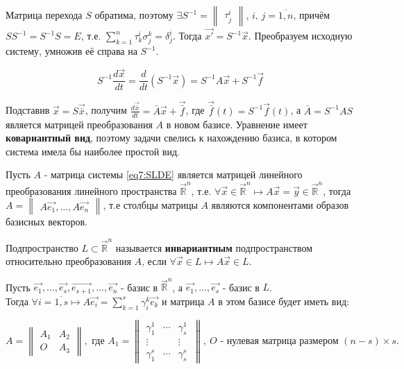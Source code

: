 Матрица перехода $S$ обратима, поэтому $\exists S^{-1} = \begin{Vmatrix} \tau_j^i \end{Vmatrix}$, $i,\,j = \overline{1, n}$, причём $SS^{-1} = S^{-1}S = E$, 
т.е. $\sum \limits_{k = 1}^n \tau_k^i \sigma_j^k = \delta_j^i$. Тогда $\vec{x'} = S^{-1}\vec{x}$.
Преобразуем исходную систему, умножив её справа на $S^{-1}$.

\[ S^{-1} \frac{d\vec{x}}{dt} = \frac{d}{dt} (S^{-1}\vec{x}) = S^{-1}A\vec{x} + S^{-1}\vec{f}\]

Подставив $\vec x = S \vec{\bar{x}}$, получим $\frac{d\vec{\bar{x}}}{dt} = \bar{A} \vec{x} + \vec{\bar{f}}$, где $\vec{\bar{f}}(t) = S^{-1}\vec{f}(t)$, 
а $\bar{A} = S^{-1}AS$ является матрицей преобразования $A$ в новом базисе. Уравнение имеет \textbf{ковариантный вид}, поэтому задачи свелись к нахождению базиса, в котором система имела бы наиболее простой вид.

Пусть $A$ - матрица системы \eqref{eq7:SLDE} является матрицей линейного преобразования линейного пространства $\vec{\mathbb{R}}^n$, 
т.е. $\forall \vec{x} \in \vec{\mathbb{R}}^n \mapsto A\vec{x} = \vec{y} \in \vec{\mathbb{R}}^n$, тогда $A = \begin{Vmatrix} A\vec{e_1}, ..., A\vec{e_n} \end{Vmatrix}$, 
т.е столбцы матрицы $A$ являются компонентами образов базисных векторов.


\begin{definition}
    Подпространство $L \subset \vec{\mathbb{R}}^n$ называется \textbf{инвариантным} подпространством относительно преобразования $A$, если $\forall \vec{x} \in L \mapsto A \vec{x} \in L$.
\end{definition}

Пусть $\vec{e_1}, ..., \vec{e_s}, \vec{e_{s+1}}, ..., \vec{e_n}$ - базис в $\vec{\mathbb{R}}^n$, а $\vec{e_1}, ..., \vec{e_s}$ - базис в $L$. \\
Тогда $\forall i = \overline{1, s} \mapsto A\vec{e_i} = \sum\limits_{k=1}^s \gamma_i^k \vec{e_k}$ и матрица $A$ в этом базисе будет иметь вид:

\[ A = \begin{Vmatrix} A_1 & A_2 \\ O & A_3 \end{Vmatrix}, \text{ где } A_1 = \begin{Vmatrix} \gamma_1^1 & \cdots & \gamma_s^1 \\ \vdots & & \vdots \\ \gamma_1^s &\cdots & \gamma_s^s\ \end{Vmatrix}, ~O \text{ - нулевая матрица размером } (n - s) \times s. \]

